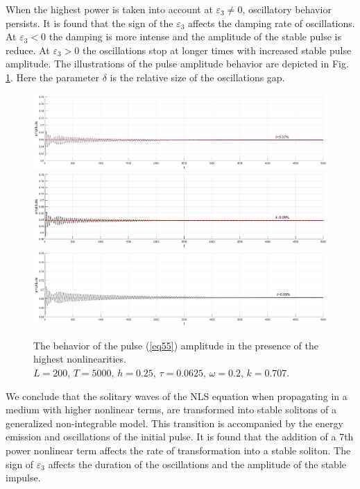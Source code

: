 \documentclass[preprint,12pt]{elsarticle}
\begin{document}
When the highest power is taken into account at \(\varepsilon_{3}\ne0\), oscillatory behavior persists. It is found that the sign of the \(\varepsilon_{3}\) affects the damping rate of oscillations. At \(\varepsilon _{3}<0\) the damping is more intense and the amplitude of the stable pulse is reduce. At \(\varepsilon _{3}>0\) the oscillations stop at longer times with increased stable pulse amplitude. The illustrations of the pulse amplitude behavior are depicted in Fig. \ref{fig48}. Here the parameter \(\delta\) is the relative size of the oscillations gap.
\begin{figure}[H] %
\begin{minipage}[h]{1\linewidth}
\includegraphics[width=1\linewidth]{fig35.eps}
\includegraphics[width=1\linewidth]{fig36.eps}
\includegraphics[width=1\linewidth]{fig37.eps}
\end{minipage}
\caption{The behavior of the pulse (\ref{eq55}) amplitude in the presence of the highest nonlinearities.
\(L=200,\, T=5000,\, h=0.25,\, \tau=0.0625,\, \omega=0.2,\, k=0.707\).}
\label{fig48}
\end{figure}

We conclude that the solitary waves of the NLS equation when propagating in a medium with higher nonlinear terms, are transformed into stable solitons of a generalized non-integrable model. This transition is accompanied by the energy emission and oscillations of the initial pulse. It is found that the addition of a 7th power nonlinear term affects the rate of transformation into a stable soliton. The sign of \(\varepsilon_{3}\) affects the duration of the oscillations and the amplitude of the stable impulse.
\end{document}
